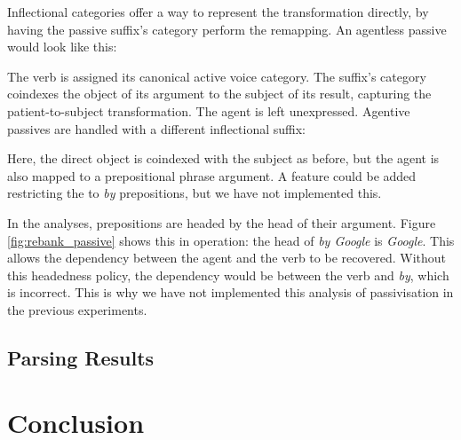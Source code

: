 \documentclass[11pt]{article}
\begin{document}
Inflectional categories offer a way to represent the transformation directly,
by having the passive suffix's category perform the remapping. An agentless
passive would look like this:
\begin{center}
 \small
{}

\end{center}


The verb is assigned its canonical active voice category. The suffix's category
coindexes the object of its argument to the subject of its result, capturing the
patient-to-subject transformation. The agent is left unexpressed.
Agentive passives are handled with a different inflectional suffix:
\begin{center}
 \small
{}
\end{center}

Here, the direct object is coindexed with the subject as before, but the agent
is also mapped to a prepositional phrase argument. A feature could be added
restricting the  to \emph{by} prepositions, but we have not implemented
this.

In the \citet{honnibal:10} analyses, prepositions are headed by the head of their 
argument. Figure \ref{fig:rebank_passive} shows this in operation: the head of
\emph{by Google} is \emph{Google}. This allows the dependency between the agent and the
verb to be recovered. Without this headedness policy, the dependency would be between
the verb and \emph{by}, which is incorrect. This is why we have not implemented this
analysis of passivisation in the previous experiments.



\subsection{Parsing Results}


\pagebreak

\section{Conclusion}
\pagebreak



\end{document}
